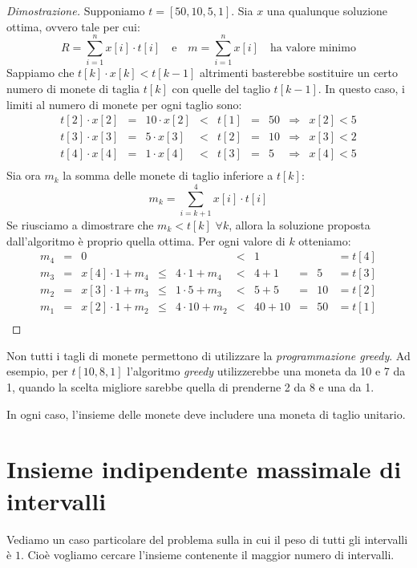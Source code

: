 \begin{proof}[Dimostrazione]
    Supponiamo $t=[50, 10, 5, 1]$. Sia $x$ una qualunque soluzione ottima, ovvero
    tale per cui:
    \[R=\sum_{i=1}^n x[i]\cdot t[i]\quad\text{e}\quad m=\sum_{i=1}^n x[i]\quad
    \text{ha valore minimo}\]
    Sappiamo che $t[k]\cdot x[k]<t[k-1]$ altrimenti basterebbe sostituire un certo
    numero di monete di taglia $t[k]$ con quelle del taglio $t[k-1]$. In questo
    caso, i limiti al numero di monete per ogni taglio sono:
    \[\begin{array}{rclccclcl}
        t[2]\cdot x[2] & = & 10\cdot x[2] & < & t[1] & = & 50 & \Rightarrow & x[2]<5\\
        t[3]\cdot x[3] & = & 5\cdot x[3] & < & t[2] & = & 10 & \Rightarrow & x[3]<2\\
        t[4]\cdot x[4] & = & 1\cdot x[4] & < & t[3] & = & 5 & \Rightarrow & x[4]<5\\
    \end{array}\]
    Sia ora $m_k$ la somma delle monete di taglio inferiore a $t[k]$:
    \[m_k=\sum_{i=k+1}^4 x[i]\cdot t[i]\]
    Se riusciamo a dimostrare che $m_k<t[k]$ $\forall k$, allora la soluzione
    proposta dall'algoritmo è proprio quella ottima. Per ogni valore di $k$
    otteniamo:
    \[\begin{array}{rclclclclc}
        m_4 & = & 0 & & & < & 1 & & & =t[4]\\
        m_3 & = & x[4]\cdot1+m_4 & \leq & 4\cdot 1+m_4 & < & 4+1 & = & 5 & =t[3]\\
        m_2 & = & x[3]\cdot1+m_3 & \leq & 1\cdot 5+m_3 & < & 5+5 & = & 10 & =t[2]\\
        m_1 & = & x[2]\cdot1+m_2 & \leq & 4\cdot 10+m_2 & < & 40+10 & = & 50 & =t[1]\\
    \end{array}\]
\end{proof}
\begin{note}
    Non tutti i tagli di monete permettono di utilizzare la \emph{programmazione
    greedy}. Ad esempio, per $t[10,8,1]$ l'algoritmo \emph{greedy} utilizzerebbe
    una moneta da 10 e 7 da 1, quando la scelta migliore sarebbe quella di
    prenderne 2 da 8 e una da 1.
\end{note}
\begin{note}
    In ogni caso, l'insieme delle monete deve includere una moneta di taglio
    unitario.
\end{note}

\section{Insieme indipendente massimale di intervalli}
Vediamo un caso particolare del problema sulla  in cui il peso
di tutti gli intervalli è $1$. Cioè vogliamo cercare l'insieme contenente il
maggior numero di intervalli.

